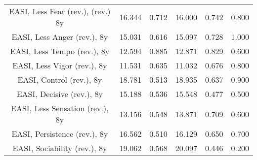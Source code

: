 \begin{longtable}{c c c c c c}
EASI, Less Fear (rev.), (rev.) 8y & 16.344 & 0.712 &  16.000 & 0.742 & 0.800 \\
EASI, Less Anger (rev.), 8y & 15.031 & 0.616 &  15.097 & 0.728 & 1.000 \\
EASI, Less Tempo (rev.), 8y & 12.594 & 0.885 &  12.871 & 0.829 & 0.600 \\
EASI, Less Vigor (rev.), 8y & 11.531 & 0.635 &  11.032 & 0.676 & 0.800 \\
EASI, Control (rev.), 8y & 18.781 & 0.513 &  18.935 & 0.637 & 0.900 \\
EASI, Decisive (rev.), 8y & 15.188 & 0.536 &  15.548 & 0.477 & 0.500 \\
EASI, Less Sensation (rev.), 8y & 13.156 & 0.548 &  13.871 & 0.709 & 0.600 \\
EASI, Persistence (rev.), 8y & 16.562 & 0.510 &  16.129 & 0.650 & 0.700 \\
EASI, Sociability (rev.), 8y & 19.062 & 0.568 &  20.097 & 0.446 & 0.200 \\
\bottomrule
\end{longtable}
